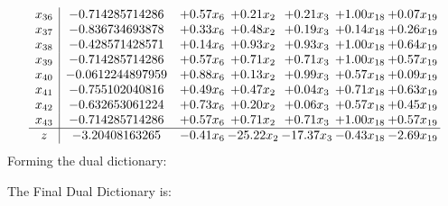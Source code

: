 \documentclass[8pt]{article}
\begin{document}
\[\begin{array}{c| c c@{\hskip 2pt} c@{\hskip 2pt} c@{\hskip 2pt} c@{\hskip 2pt} c@{\hskip 2pt} }
 x_{36}   &  -0.714285714286 & +  0.57 x_{6} & +  0.21 x_{2} & +  0.21 x_{3} & +  1.00 x_{18} & +  0.07 x_{19}\\
 x_{37}   &  -0.836734693878 & +  0.33 x_{6} & +  0.48 x_{2} & +  0.19 x_{3} & +  0.14 x_{18} & +  0.26 x_{19}\\
 x_{38}   &  -0.428571428571 & +  0.14 x_{6} & +  0.93 x_{2} & +  0.93 x_{3} & +  1.00 x_{18} & +  0.64 x_{19}\\
 x_{39}   &  -0.714285714286 & +  0.57 x_{6} & +  0.71 x_{2} & +  0.71 x_{3} & +  1.00 x_{18} & +  0.57 x_{19}\\
 x_{40}   &  -0.0612244897959 & +  0.88 x_{6} & +  0.13 x_{2} & +  0.99 x_{3} & +  0.57 x_{18} & +  0.09 x_{19}\\
 x_{41}   &  -0.755102040816 & +  0.49 x_{6} & +  0.47 x_{2} & +  0.04 x_{3} & +  0.71 x_{18} & +  0.63 x_{19}\\
 x_{42}   &  -0.632653061224 & +  0.73 x_{6} & +  0.20 x_{2} & +  0.06 x_{3} & +  0.57 x_{18} & +  0.45 x_{19}\\
 x_{43}   &  -0.714285714286 & +  0.57 x_{6} & +  0.71 x_{2} & +  0.71 x_{3} & +  1.00 x_{18} & +  0.57 x_{19}\\
\hline
z    &  -3.20408163265 & -0.41 x_{6} & -25.22 x_{2} & -17.37 x_{3} & -0.43 x_{18} & -2.69 x_{19}\\
\end{array}\]
Forming the dual dictionary:

The Final Dual Dictionary is: 
\end{document}

